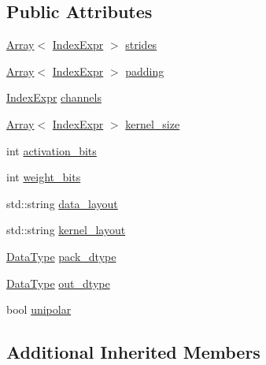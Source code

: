 \subsection*{Public Attributes}
\begin{DoxyCompactItemize}
\item 
\hyperlink{classtvm_1_1Array}{Array}$<$ \hyperlink{namespacetvm_1_1relay_ae153a27d81399fd266b8d598227764c4}{Index\+Expr} $>$ \hyperlink{structtvm_1_1relay_1_1BinaryConv2DAttrs_a1c81140a7e3c0988b8ffe8e8c21cee98}{strides}
\item 
\hyperlink{classtvm_1_1Array}{Array}$<$ \hyperlink{namespacetvm_1_1relay_ae153a27d81399fd266b8d598227764c4}{Index\+Expr} $>$ \hyperlink{structtvm_1_1relay_1_1BinaryConv2DAttrs_a757b4bdd606a00828264b9f5be7a717e}{padding}
\item 
\hyperlink{namespacetvm_1_1relay_ae153a27d81399fd266b8d598227764c4}{Index\+Expr} \hyperlink{structtvm_1_1relay_1_1BinaryConv2DAttrs_afd527f4e8a2f2498b5ac9607df628b3b}{channels}
\item 
\hyperlink{classtvm_1_1Array}{Array}$<$ \hyperlink{namespacetvm_1_1relay_ae153a27d81399fd266b8d598227764c4}{Index\+Expr} $>$ \hyperlink{structtvm_1_1relay_1_1BinaryConv2DAttrs_a03491f260db18ada216bb87e35931a49}{kernel\+\_\+size}
\item 
int \hyperlink{structtvm_1_1relay_1_1BinaryConv2DAttrs_a195cc0d151991c9493b02e01e2fbe54d}{activation\+\_\+bits}
\item 
int \hyperlink{structtvm_1_1relay_1_1BinaryConv2DAttrs_a70aa926aba4fc774c15786358315141a}{weight\+\_\+bits}
\item 
std\+::string \hyperlink{structtvm_1_1relay_1_1BinaryConv2DAttrs_a6b952d430abee4b51035f2517523a6f8}{data\+\_\+layout}
\item 
std\+::string \hyperlink{structtvm_1_1relay_1_1BinaryConv2DAttrs_ada14efece2cacda93ed5f51141d0c55d}{kernel\+\_\+layout}
\item 
\hyperlink{namespacetvm_a41918af1a1dc386388639a9d3ad06c5d}{Data\+Type} \hyperlink{structtvm_1_1relay_1_1BinaryConv2DAttrs_a52047b0e68189ec30e8535941021be47}{pack\+\_\+dtype}
\item 
\hyperlink{namespacetvm_a41918af1a1dc386388639a9d3ad06c5d}{Data\+Type} \hyperlink{structtvm_1_1relay_1_1BinaryConv2DAttrs_a3b3627df5ec9e23a15a0ae027168d77a}{out\+\_\+dtype}
\item 
bool \hyperlink{structtvm_1_1relay_1_1BinaryConv2DAttrs_a7e0ad68dce226079b769a678aa01dc49}{unipolar}
\end{DoxyCompactItemize}
\subsection*{Additional Inherited Members}


